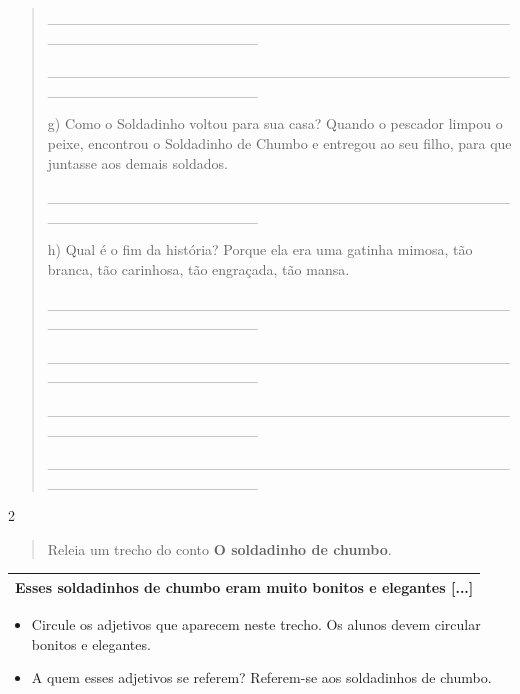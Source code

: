 \begin{itemize}
{{{\begin{itemize}
\begin{itemize}
\begin{itemize}
\begin{quote}
\_\_\_\_\_\_\_\_\_\_\_\_\_\_\_\_\_\_\_\_\_\_\_\_\_\_\_\_\_\_\_\_\_\_\_\_\_\_\_\_\_\_\_\_\_\_\_\_\_\_\_\_\_\_\_\_\_\_\_\_\_\_\_\_

\_\_\_\_\_\_\_\_\_\_\_\_\_\_\_\_\_\_\_\_\_\_\_\_\_\_\_\_\_\_\_\_\_\_\_\_\_\_\_\_\_\_\_\_\_\_\_\_\_\_\_\_\_\_\_\_\_\_\_\_\_\_\_\_

g) Como o Soldadinho voltou para sua casa? Quando o pescador limpou o
peixe, encontrou o Soldadinho de Chumbo e entregou ao seu filho, para
que juntasse aos demais soldados.

\_\_\_\_\_\_\_\_\_\_\_\_\_\_\_\_\_\_\_\_\_\_\_\_\_\_\_\_\_\_\_\_\_\_\_\_\_\_\_\_\_\_\_\_\_\_\_\_\_\_\_\_\_\_\_\_\_\_\_\_\_\_\_\_

h) Qual é o fim da história? Porque ela era uma gatinha mimosa, tão
branca, tão carinhosa, tão engraçada, tão mansa.

\_\_\_\_\_\_\_\_\_\_\_\_\_\_\_\_\_\_\_\_\_\_\_\_\_\_\_\_\_\_\_\_\_\_\_\_\_\_\_\_\_\_\_\_\_\_\_\_\_\_\_\_\_\_\_\_\_\_\_\_\_\_\_\_

\_\_\_\_\_\_\_\_\_\_\_\_\_\_\_\_\_\_\_\_\_\_\_\_\_\_\_\_\_\_\_\_\_\_\_\_\_\_\_\_\_\_\_\_\_\_\_\_\_\_\_\_\_\_\_\_\_\_\_\_\_\_\_\_

\_\_\_\_\_\_\_\_\_\_\_\_\_\_\_\_\_\_\_\_\_\_\_\_\_\_\_\_\_\_\_\_\_\_\_\_\_\_\_\_\_\_\_\_\_\_\_\_\_\_\_\_\_\_\_\_\_\_\_\_\_\_\_\_

\_\_\_\_\_\_\_\_\_\_\_\_\_\_\_\_\_\_\_\_\_\_\_\_\_\_\_\_\_\_\_\_\_\_\_\_\_\_\_\_\_\_\_\_\_\_\_\_\_\_\_\_\_\_\_\_\_\_\_\_\_\_\_\_
\end{quote}

\num{2}

\begin{quote}
Releia um trecho do conto \textbf{O soldadinho de chumbo}.
\end{quote}

\begin{longtable}[]{@{}l@{}}
\toprule
Esses soldadinhos de chumbo eram muito bonitos e elegantes
{[}...{]}\tabularnewline
\bottomrule
\end{longtable}

\begin{itemize}
\item
  Circule os adjetivos que aparecem neste trecho. Os alunos devem
  circular bonitos e elegantes.
\item
  A quem esses adjetivos se referem? Referem-se aos soldadinhos de
  chumbo.
\end{itemize}


\end{itemize}
\end{itemize}
\end{itemize}}}}
\end{itemize}
